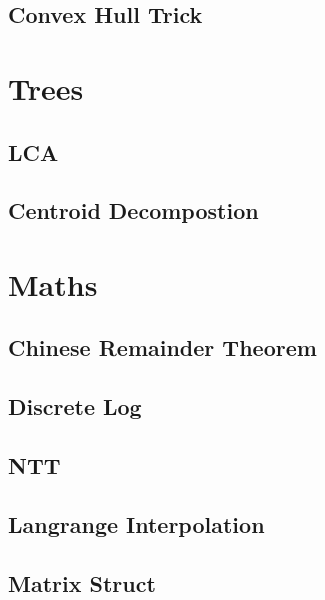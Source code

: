 \subsection{Convex Hull Trick}
\raggedbottom
\hrulefill

\section{Trees}
\subsection{LCA}
\raggedbottom
\hrulefill
\subsection{Centroid Decompostion}
\raggedbottom
\hrulefill

\section{Maths}
\subsection{Chinese Remainder Theorem}
\raggedbottom
\hrulefill
\subsection{Discrete Log}
\raggedbottom
\hrulefill
\subsection{NTT}
\raggedbottom
\hrulefill
\subsection{Langrange Interpolation}
\raggedbottom
\hrulefill
\subsection{Matrix Struct}
\raggedbottom
\hrulefill
